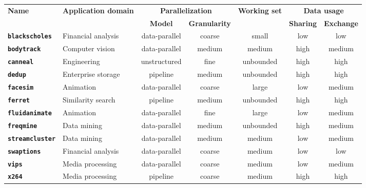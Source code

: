 \begin{figure*}
\centering
\begin{tabular}{|l|l|c|c|c|c|c|}
\hline
\multirow{2}{*}{\textbf{Name}} & \multirow{2}{*}{\textbf{Application domain}} & \multicolumn{2}{|c|}{\textbf{Parallelization}} & \multirow{2}{*}{\textbf{Working set}} & \multicolumn{2}{|c|}{\textbf{Data usage}} \\
& & \textbf{Model} & \textbf{Granularity} & & \textbf{Sharing} & \textbf{Exchange} \\
\hline
\textbf{\texttt{\text{*}blackscholes}} & Financial analysis & data-parallel & coarse & small & low & low \\
\hline
\textbf{\texttt{bodytrack}} & Computer vision & data-parallel & medium & medium & high & medium \\
\hline
\textbf{\texttt{\text{*}canneal}} & Engineering & unstructured & fine & unbounded & high & high \\
\hline
\textbf{\texttt{\text{*}dedup}} & Enterprise storage & pipeline & medium & unbounded & high & high \\
\hline
\textbf{\texttt{facesim}} & Animation & data-parallel & coarse & large & low & medium \\
\hline
\textbf{\texttt{ferret}} & Similarity search & pipeline & medium & unbounded & high & high \\
\hline
\textbf{\texttt{\text{*}fluidanimate}} & Animation & data-parallel & fine & large & low & medium \\
\hline
\textbf{\texttt{freqmine}} & Data mining & data-parallel & medium & unbounded & high & medium \\
\hline
\textbf{\texttt{\text{*}streamcluster}} & Data mining & data-parallel & medium & medium & low & medium \\
\hline
\textbf{\texttt{\text{*}swaptions}} & Financial analysis & data-parallel & coarse & medium & low & low \\
\hline
\textbf{\texttt{vips}} & Media processing & data-parallel & coarse & medium & low & medium \\
\hline
\textbf{\texttt{x264}} & Media processing & pipeline & coarse & medium & high & high \\
\hline
\end{tabular}
\label{table:parsec-apps}
\end{figure*}